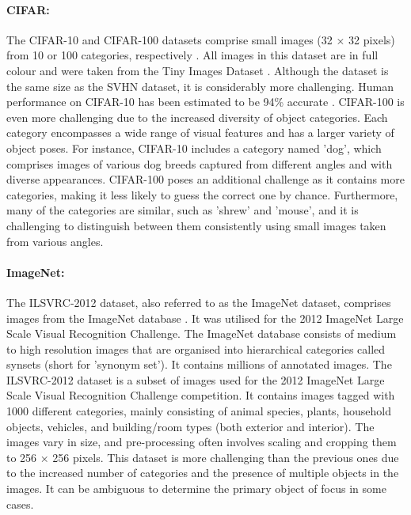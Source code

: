 \paragraph{CIFAR:} The CIFAR-10 and CIFAR-100 datasets comprise small images (32 × 32 pixels) from 10 or 100 categories, respectively \cite{krizhevsky2009learning}. All images in this dataset are in full colour and were taken from the Tiny Images Dataset \cite{torralba200880}. Although the dataset is the same size as the SVHN dataset, it is considerably more challenging. Human performance on CIFAR-10 has been estimated to be 94\% accurate \cite{karpathy2011lessons}. CIFAR-100 is even more challenging due to the increased diversity of object categories. Each category encompasses a wide range of visual features and has a larger variety of object poses. For instance, CIFAR-10 includes a category named 'dog', which comprises images of various dog breeds captured from different angles and with diverse appearances. CIFAR-100 poses an additional challenge as it contains more categories, making it less likely to guess the correct one by chance. Furthermore, many of the categories are similar, such as 'shrew' and 'mouse', and it is challenging to distinguish between them consistently using small images taken from various angles.

\paragraph{ImageNet:} The ILSVRC-2012 dataset, also referred to as the ImageNet dataset, comprises images from the ImageNet database \cite{russakovsky2015imagenet}. It was utilised for the 2012 ImageNet Large Scale Visual Recognition Challenge. The ImageNet database consists of medium to high resolution images that are organised into hierarchical categories called synsets (short for 'synonym set'). It contains millions of annotated images. The ILSVRC-2012 dataset is a subset of images used for the 2012 ImageNet Large Scale Visual Recognition Challenge competition. It contains images tagged with 1000 different categories, mainly consisting of animal species, plants, household objects, vehicles, and building/room types (both exterior and interior). The images vary in size, and pre-processing often involves scaling and cropping them to 256 × 256 pixels. This dataset is more challenging than the previous ones due to the increased number of categories and the presence of multiple objects in the images. It can be ambiguous to determine the primary object of focus in some cases. \\

